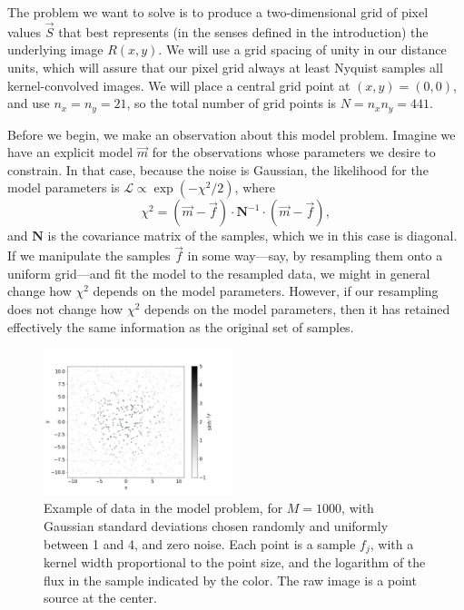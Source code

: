 \documentclass[twocolumn,tighten]{aastex61}
\begin{document}
The problem we want to solve is to produce a two-dimensional grid of
pixel values $\vec{S}$ that best represents (in the senses defined in
the introduction) the underlying image $R(x, y)$. We will use a grid
spacing of unity in our distance units, which will assure that our
pixel grid always at least Nyquist samples all kernel-convolved
images. We will place a central grid point at $(x, y) = (0, 0)$, and
use $n_x = n_y =21$, so the total number of grid points is $N=n_xn_y =
441$.

Before we begin, we make an observation about this model
problem. Imagine we have an explicit model $\vec{m}$ for the
observations whose parameters we desire to constrain. In that case,
because the noise is Gaussian, the likelihood for the model parameters
is $\mathcal{L} \propto \exp(-\chi^2/2)$, where
\begin{equation}
\label{eq:chi2}
  \chi^2 = \left(\vec{m} - \vec{f}\right)\cdot {\mathbf N}^{-1} \cdot
  \left(\vec{m} - \vec{f}\right),
\end{equation}
and $\mathbf{N}$ is the covariance matrix of the samples, which we in
this case is diagonal. If we manipulate the samples $\vec{f}$ in some
way---say, by resampling them onto a uniform grid---and fit the model
to the resampled data, we might in general change how $\chi^2$ depends
on the model parameters. However, if our resampling does not change
how $\chi^2$ depends on the model parameters, then it has retained
effectively the same information as the original set of samples.

\begin{figure}[t!]
\centering
\includegraphics[width=0.49\textwidth, angle=0]{figures/scattered-data.png}
\caption{ \label{fig:scattered-data} Example of data in the model
  problem, for $M=1000$, with Gaussian standard deviations chosen
  randomly and uniformly between 1 and 4, and zero noise. Each point
  is a sample $f_j$, with a kernel width proportional to the point
  size, and the logarithm of the flux in the sample indicated by the
  color. The raw image is a point source at the center.}
\end{figure}
\end{document}
